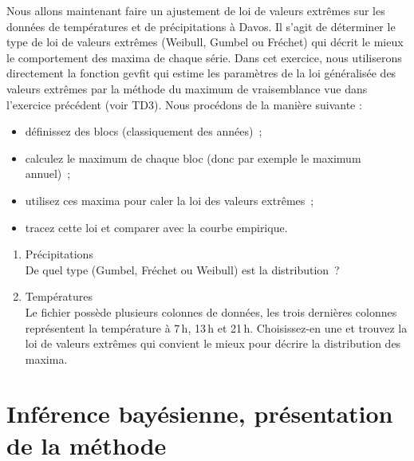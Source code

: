 \documentclass[a4paper]{article}
\begin{document}
 Nous allons maintenant faire un ajustement de loi de valeurs extrêmes sur les données de températures et de précipitations à Davos. Il s'agit de déterminer le type de loi de valeurs extrêmes (Weibull, Gumbel ou Fréchet) qui décrit le mieux le comportement des maxima de chaque série. Dans cet exercice, nous utiliserons directement la fonction gevfit qui estime les paramètres de la loi généralisée des valeurs extrêmes par la méthode du maximum de vraisemblance vue dans l'exercice précédent (voir TD3).
 Nous procédons de la manière suivante :\\
  \begin{itemize}
    \item définissez des blocs (classiquement des années)~;
    \item calculez le maximum de chaque bloc (donc par exemple le maximum annuel)~;
    \item utilisez ces maxima pour caler la loi des valeurs extrêmes~;
    \item tracez cette loi et comparer avec la courbe empirique.
  \end{itemize}
  \begin{enumerate}
  \item Précipitations\\
    De quel type (Gumbel, Fréchet ou Weibull) est la distribution~?\\
  \item Températures\\
Le fichier possède plusieurs colonnes de données, les trois dernières colonnes représentent la température à 7\,h, 13\,h et 21\,h. Choisissez-en une et trouvez la loi de valeurs extrêmes qui convient le mieux pour décrire la distribution des maxima.
  \end{enumerate}

\section*{Inférence bayésienne, présentation de la méthode}
\end{document}
